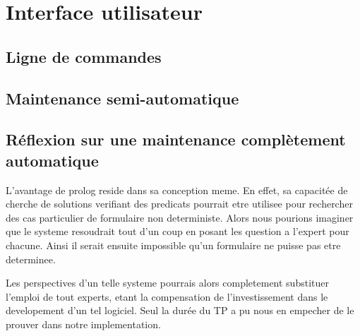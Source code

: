 
\chapter{Interface utilisateur}

\section{Ligne de commandes}

\section{Maintenance semi-automatique}

\section{Réflexion sur une maintenance complètement automatique}

L'avantage de prolog reside dans sa conception meme. En effet, sa capacit\'ee de cherche de solutions verifiant des predicats
pourrait etre utilisee pour rechercher des cas particulier de formulaire non deterministe. Alors nous pourions imaginer que le
systeme resoudrait tout d'un coup en posant les question a l'expert pour chacune. Ainsi il serait ensuite impossible qu'un
formulaire ne puisse pas etre determinee.

Les perspectives d'un telle systeme pourrais alors completement substituer l'emploi de tout experts, etant la compensation de
l'investissement dans le developement d'un tel logiciel. Seul la dur\'ee du TP a pu nous en empecher de le prouver dans notre
implementation.

